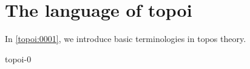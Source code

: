 \chapter{The language of topoi}
\label{topoi:0000}

In \cref{topoi:0001}, we introduce basic terminologies in topos theory.
\lipsum[3]

{topoi-0}
